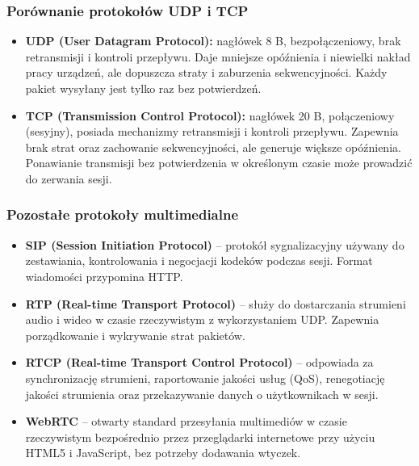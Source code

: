 \documentclass[11pt, a4paper]{article}
\begin{document}
\subsubsection{Porównanie protokołów UDP i TCP}
\begin{itemize}
    \item \textbf{UDP (User Datagram Protocol):} nagłówek 8 B, bezpołączeniowy, brak retransmisji i kontroli przepływu. Daje mniejsze opóźnienia i niewielki nakład pracy urządzeń, ale dopuszcza straty i zaburzenia sekwencyjności. Każdy pakiet wysyłany jest tylko raz bez potwierdzeń.
    \item \textbf{TCP (Transmission Control Protocol):} nagłówek 20 B, połączeniowy (sesyjny), posiada mechanizmy retransmisji i kontroli przepływu. Zapewnia brak strat oraz zachowanie sekwencyjności, ale generuje większe opóźnienia. Ponawianie transmisji bez potwierdzenia w określonym czasie może prowadzić do zerwania sesji.
\end{itemize}

\subsubsection{Pozostałe protokoły multimedialne}
\begin{itemize}
    \item \textbf{SIP (Session Initiation Protocol)} -- protokół sygnalizacyjny używany do zestawiania, kontrolowania i negocjacji kodeków podczas sesji. Format wiadomości przypomina HTTP.
    \item \textbf{RTP (Real-time Transport Protocol)} -- służy do dostarczania strumieni audio i wideo w czasie rzeczywistym z wykorzystaniem UDP. Zapewnia porządkowanie i wykrywanie strat pakietów.
    \item \textbf{RTCP (Real-time Transport Control Protocol)} -- odpowiada za synchronizację strumieni, raportowanie jakości usług (QoS), renegotiację jakości strumienia oraz przekazywanie danych o użytkownikach w sesji.
    \item \textbf{WebRTC} -- otwarty standard przesyłania multimediów w czasie rzeczywistym bezpośrednio przez przeglądarki internetowe przy użyciu HTML5 i JavaScript, bez potrzeby dodawania wtyczek.
\end{itemize}
\end{document}
